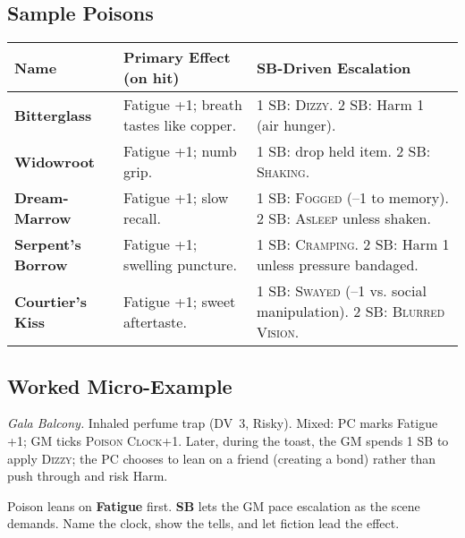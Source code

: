 \subsection*{Sample Poisons}
\begin{tabularx}{\linewidth}{>{\bfseries}l X X}
\toprule
Name & Primary Effect (on hit) & SB-Driven Escalation \\
\midrule
Bitterglass & Fatigue +1; breath tastes like copper. & 1 SB: \textsc{Dizzy}. 2 SB: Harm 1 (air hunger). \\
Widowroot & Fatigue +1; numb grip. & 1 SB: drop held item. 2 SB: \textsc{Shaking}. \\
Dream-Marrow & Fatigue +1; slow recall. & 1 SB: \textsc{Fogged} (–1 to memory). 2 SB: \textsc{Asleep} unless shaken. \\
Serpent’s Borrow & Fatigue +1; swelling puncture. & 1 SB: \textsc{Cramping}. 2 SB: Harm 1 unless pressure bandaged. \\
Courtier’s Kiss & Fatigue +1; sweet aftertaste. & 1 SB: \textsc{Swayed} (–1 vs. social manipulation). 2 SB: \textsc{Blurred Vision}. \\
\bottomrule
\end{tabularx}

\subsection*{Worked Micro-Example}
\emph{Gala Balcony.} Inhaled perfume trap (DV~3, Risky). Mixed: PC marks Fatigue +1; GM ticks \textsc{Poison Clock}+1. Later, during the toast, the GM spends 1 SB to apply \textsc{Dizzy}; the PC chooses to lean on a friend (creating a bond) rather than push through and risk Harm.

\begin{tcolorbox}[title={Summary},colback=gray!5,colframe=black]
\small Poison leans on \textbf{Fatigue} first. \textbf{SB} lets the GM pace escalation as the scene demands. Name the clock, show the tells, and let fiction lead the effect.
\end{tcolorbox}

